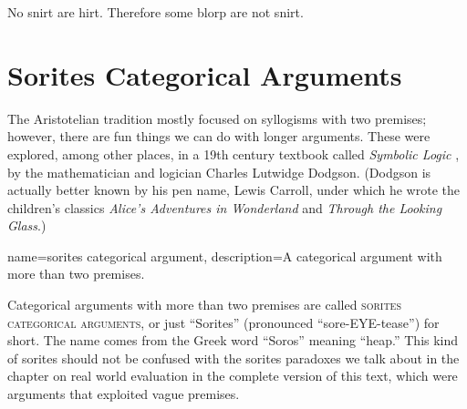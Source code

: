 {\begin{exercises}


\item No snirt are hirt. Therefore some blorp are not snirt.

\end{exercises}



\section{Sorites Categorical Arguments }

The Aristotelian tradition mostly focused on syllogisms with two premises; however, there are fun things we can do with longer arguments. These were explored, among other places, in a 19th century textbook called \textit{Symbolic Logic} \citep{Dodgson1896}, by the mathematician and logician Charles Lutwidge Dodgson. (Dodgson is actually better known by his pen name, Lewis Carroll, under which he wrote the children's classics \textit{Alice's Adventures in Wonderland} and \textit{Through the Looking Glass}.)

{
name=sorites categorical argument,
description={A categorical argument with more than two premises.}
}

Categorical arguments with more than two premises are called \textsc{\glspl{sorites categorical argument}}, \label{def:sorites_categorical_arguments} or just ``Sorites'' (pronounced ``sore-EYE-tease'') for short. The name comes from the Greek word ``Soros'' meaning ``heap.'' This kind of sorites should not be confused with the sorites paradoxes we talk about in the chapter on real world evaluation in the complete version of this text, \label{ver_var}  which were arguments that exploited vague premises. 

}
